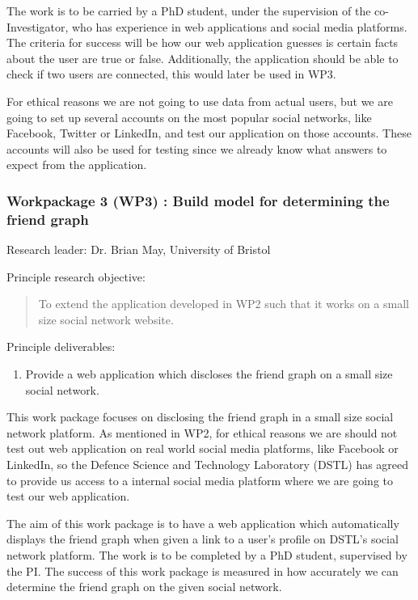 \documentclass[a4paper,11pt]{article}
\begin{document}
The work is to be carried by a PhD student, under the supervision of the co-Investigator, who has experience in web applications and social media platforms. The criteria for success will be how  our web application guesses is certain facts about the user are true or false. Additionally, the application should be able to check if two users are connected, this would later be used in WP3. 

For ethical reasons we are not going to use data from actual users, but we are going to set up several accounts on the most popular social networks, like Facebook, Twitter or LinkedIn, and test our application on those accounts. These accounts will also be used for testing since we already know what answers to expect from the application.

\subsubsection*{Workpackage 3 (WP3) : Build model for determining the friend graph}
Research leader: Dr. Brian May, University of Bristol

Principle research objective:
\begin{quote}
	To extend the application developed in WP2 such that it works on a small size social network website.
\end{quote}

Principle deliverables:
\begin{enumerate}
\item Provide a web application which discloses the friend graph on a small size social network.
\end{enumerate}

This work package focuses on disclosing the friend graph in a small size social network platform. As mentioned in WP2, for ethical reasons we are should not test out web application on real world social media platforms, like Facebook or LinkedIn, so the Defence Science and Technology Laboratory (DSTL) has agreed to provide us access to a internal social media platform where we are going to test our web application. 

The aim of this work package is to have a web application which automatically displays the friend graph when given a link to a user's profile on DSTL's social network platform. The work is to be completed by a PhD student, supervised by the PI. The success of this work package is measured in how accurately we can determine the friend graph on the given social network.
\end{document}
